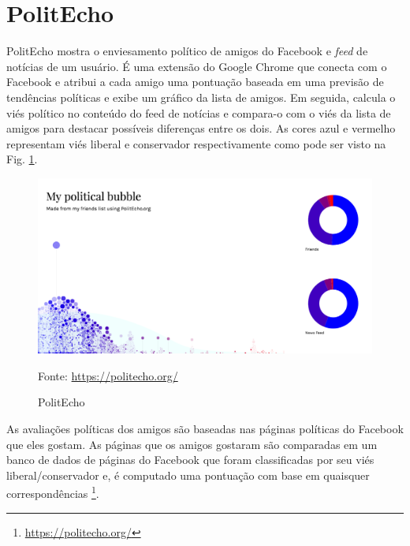 \section{PolitEcho}

PolitEcho mostra o enviesamento político de amigos do Facebook e \textit{feed} de notícias de um usuário. É uma extensão do Google Chrome que conecta com o Facebook e atribui a cada amigo uma pontuação baseada em uma previsão de tendências políticas e exibe um gráfico da lista de amigos. Em seguida, calcula o viés político no conteúdo do feed de notícias e compara-o com o viés da lista de amigos para destacar possíveis diferenças entre os dois. As cores azul e vermelho representam viés liberal e conservador respectivamente como pode ser visto na Fig. \ref{fig05}.


\begin{figure}[h]
	\centering
	\includegraphics[keepaspectratio=true,scale=0.3]{figuras/politecho.png}
	\caption{PolitEcho}
	Fonte: \url{https://politecho.org/}
	\label{fig05}
\end{figure}


As avaliações políticas dos amigos são baseadas nas páginas políticas do Facebook que eles gostam. As páginas que os amigos gostaram são comparadas em um banco de dados de páginas do Facebook que foram classificadas por seu viés liberal/conservador e, é computado uma pontuação com base em quaisquer correspondências \footnote{\href{https://politecho.org/}{https://politecho.org/}}.\